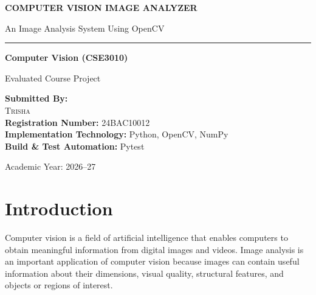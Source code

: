 \documentclass[11pt,a4paper]{article}
\begin{document}
\begin{titlepage}
    \centering
    \vspace*{1.5cm}

    {\Huge\bfseries\color{primary} COMPUTER VISION IMAGE ANALYZER \par}
    \vspace{0.8cm}
    {\LARGE\color{secondary} An Image Analysis System Using OpenCV \par}
    \vspace{0.5cm}
    \textcolor{accent}{\rule{0.6\textwidth}{2pt}}

    \vspace{2.5cm}
    {\Large\bfseries Computer Vision (CSE3010) \par}
    \vspace{0.3cm}
    {\large Evaluated Course Project \par}

    \vspace{3.5cm}
    \begin{minipage}{0.75\textwidth}
        \centering
        \large
        \textbf{Submitted By:}\\[0.3em]
        \textsc{\Large Trisha}\\[0.2em]
        \textbf{Registration Number:} 24BAC10012\\[0.5em]
        \textbf{Implementation Technology:} Python, OpenCV, NumPy\\[0.2em]
        \textbf{Build \& Test Automation:} Pytest
    \end{minipage}

    \vfill
    {\large Academic Year: 2026--27 \par}
    \vspace*{1cm}
\end{titlepage}

\newpage
{}
\tableofcontents
\newpage
{}
\setcounter{page}{1}

\section{Introduction}
Computer vision is a field of artificial intelligence that enables computers to obtain meaningful information from digital images and videos. Image analysis is an important application of computer vision because images can contain useful information about their dimensions, visual quality, structural features, and objects or regions of interest.
\end{document}
